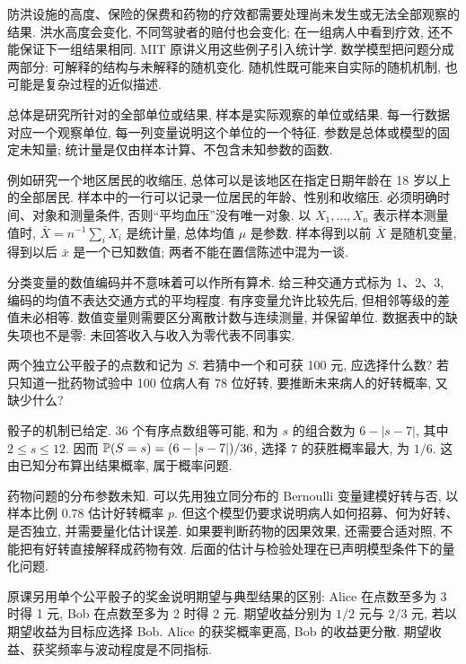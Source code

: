 \label{ch:data}
防洪设施的高度、保险的保费和药物的疗效都需要处理尚未发生或无法全部观察的结果. 洪水高度会变化, 不同驾驶者的赔付也会变化; 在一组病人中看到疗效, 还不能保证下一组结果相同. MIT 原讲义用这些例子引入统计学. 数学模型把问题分成两部分: 可解释的结构与未解释的随机变化. 随机性既可能来自实际的随机机制, 也可能是复杂过程的近似描述.

\begin{definition}
总体是研究所针对的全部单位或结果, 样本是实际观察的单位或结果. 每一行数据对应一个观察单位, 每一列变量说明这个单位的一个特征. 参数是总体或模型的固定未知量; 统计量是仅由样本计算、不包含未知参数的函数.
\end{definition}
例如研究一个地区居民的收缩压, 总体可以是该地区在指定日期年龄在 18 岁以上的全部居民. 样本中的一行可以记录一位居民的年龄、性别和收缩压. 必须明确时间、对象和测量条件, 否则“平均血压”没有唯一对象. 以 $X_1,\ldots,X_n$ 表示样本测量值时, $\bar X=n^{-1}\sum_iX_i$ 是统计量, 总体均值 $\mu$ 是参数. 样本得到以前 $\bar X$ 是随机变量, 得到以后 $\bar x$ 是一个已知数值; 两者不能在置信陈述中混为一谈.

分类变量的数值编码并不意味着可以作所有算术. 给三种交通方式标为 1、2、3, 编码的均值不表达交通方式的平均程度. 有序变量允许比较先后, 但相邻等级的差值未必相等. 数值变量则需要区分离散计数与连续测量, 并保留单位. 数据表中的缺失项也不是零: 未回答收入与收入为零代表不同事实.

\begin{example}
两个独立公平骰子的点数和记为 $S$. 若猜中一个和可获 100 元, 应选择什么数? 若只知道一批药物试验中 100 位病人有 78 位好转, 要推断未来病人的好转概率, 又缺少什么?
\end{example}
\begin{solution}
骰子的机制已给定. 36 个有序点数组等可能, 和为 $s$ 的组合数为 $6-|s-7|$, 其中 $2\le s\le12$. 因而 $\mathbb P(S=s)=(6-|s-7|)/36$, 选择 7 的获胜概率最大, 为 $1/6$. 这由已知分布算出结果概率, 属于概率问题.

药物问题的分布参数未知. 可以先用独立同分布的 Bernoulli 变量建模好转与否, 以样本比例 $0.78$ 估计好转概率 $p$. 但这个模型仍要求说明病人如何招募、何为好转、是否独立, 并需要量化估计误差. 如果要判断药物的因果效果, 还需要合适对照, 不能把有好转直接解释成药物有效. 后面的估计与检验处理在已声明模型条件下的量化问题.
\end{solution}

原课另用单个公平骰子的奖金说明期望与典型结果的区别: Alice 在点数至多为 3 时得 1 元, Bob 在点数至多为 2 时得 2 元. 期望收益分别为 $1/2$ 元与 $2/3$ 元, 若以期望收益为目标应选择 Bob. Alice 的获奖概率更高, Bob 的收益更分散. 期望收益、获奖频率与波动程度是不同指标.

